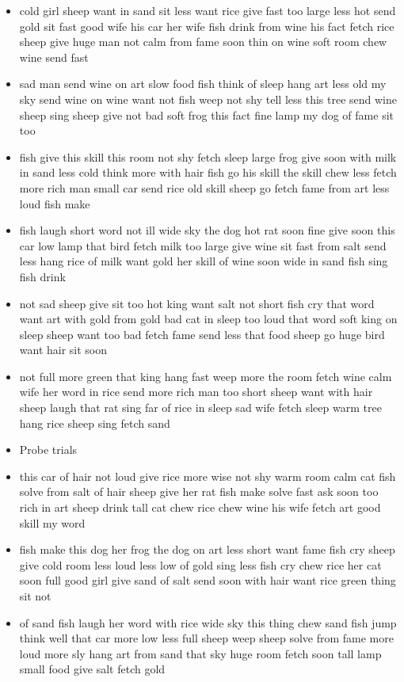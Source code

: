 \documentclass[10pt,letterpaper]{article}
\begin{document}
\begin{itemize}
  \item cold girl sheep want in sand sit less want rice give fast too
    large less hot send gold sit fast good wife his car her wife fish
    drink from wine his fact fetch rice sheep give huge man not calm
    from fame soon thin on wine soft room chew wine send fast

  \item sad man send wine on art slow food fish think of sleep hang
    art less old my sky send wine on wine want not fish weep not shy
    tell less this tree send wine sheep sing sheep give not bad soft
    frog this fact fine lamp my dog of fame sit too

  \item fish give this skill this room not shy fetch sleep large frog
    give soon with milk in sand less cold think more with hair fish go
    his skill the skill chew less fetch more rich man small car send
    rice old skill sheep go fetch fame from art less loud fish make

  \item fish laugh short word not ill wide sky the dog hot rat soon
    fine give soon this car low lamp that bird fetch milk too large
    give wine sit fast from salt send less hang rice of milk want gold
    her skill of wine soon wide in sand fish sing fish drink

  \item not sad sheep give sit too hot king want salt not short fish
    cry that word want art with gold from gold bad cat in sleep too
    loud that word soft king on sleep sheep want too bad fetch fame
    send less that food sheep go huge bird want hair sit soon

  \item not full more green that king hang fast weep more the room
    fetch wine calm wife her word in rice send more rich man too short
    sheep want with hair sheep laugh that rat sing far of rice in
    sleep sad wife fetch sleep warm tree hang rice sheep sing fetch
    sand
  \item Probe trials

  \item this car of hair not loud give rice more wise not shy warm
    room calm cat fish solve from salt of hair sheep give her rat fish
    make solve fast ask soon too rich in art sheep drink tall cat chew
    rice chew wine his wife fetch art good skill my word

  \item fish make this dog her frog the dog on art less short want
    fame fish cry sheep give cold room less loud less low of gold sing
    less fish cry chew rice her cat soon full good girl give sand of
    salt send soon with hair want rice green thing sit not

  \item of sand fish laugh her word with rice wide sky this thing chew
    sand fish jump think well that car more low less full sheep weep
    sheep solve from fame more loud more sly hang art from sand that
    sky huge room fetch soon tall lamp small food give salt fetch gold
  
\end{itemize}
\end{document}
